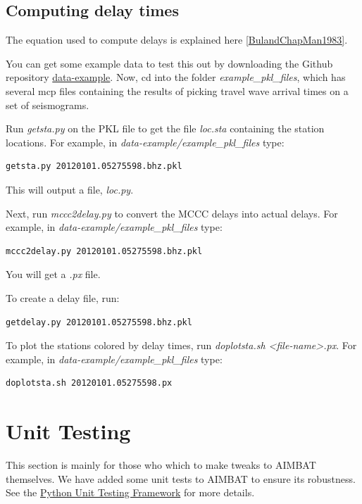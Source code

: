 \documentclass[letterpaper,10pt,english]{sphinxmanual}
\begin{document}
\section{Computing delay times}
\label{docfiles/VisualizingStations:computing-delay-times}
The equation used to compute delays is explained here {\hyperref[docfiles/citations:bulandchapman1983]{{[}BulandChapMan1983{]}}}.

You can get some example data to test this out by downloading the Github repository \href{https://github.com/pysmo/data-example}{data-example}. Now, cd into the folder \emph{example\_pkl\_files}, which has several mcp files containing the results of picking travel wave arrival times on a set of seismograms.

Run \emph{getsta.py} on the PKL file to get the file \emph{loc.sta} containing the station locations. For example, in \emph{data-example/example\_pkl\_files} type:

\begin{Verbatim}[commandchars=\\\{\}]
getsta.py 20120101.05275598.bhz.pkl
\end{Verbatim}

This will output a file, \emph{loc.py}.

Next, run \emph{mccc2delay.py} to convert the MCCC delays into actual delays. For example, in \emph{data-example/example\_pkl\_files} type:

\begin{Verbatim}[commandchars=\\\{\}]
mccc2delay.py 20120101.05275598.bhz.pkl
\end{Verbatim}

You will get a \emph{.px} file.

To create a delay file, run:

\begin{Verbatim}[commandchars=\\\{\}]
getdelay.py 20120101.05275598.bhz.pkl
\end{Verbatim}

To plot the stations colored by delay times, run \emph{doplotsta.sh \textless{}file-name\textgreater{}.px}. For example, in \emph{data-example/example\_pkl\_files} type:

\begin{Verbatim}[commandchars=\\\{\}]
doplotsta.sh 20120101.05275598.px
\end{Verbatim}


\chapter{Unit Testing}
\label{docfiles/unitTests:unit-testing}\label{docfiles/unitTests::doc}
This section is mainly for those who which to make tweaks to AIMBAT themselves. We have added some unit tests to AIMBAT to ensure its robustness. See the \href{https://docs.python.org/2/library/unittest.html}{Python Unit Testing Framework} for more details.
\end{document}
